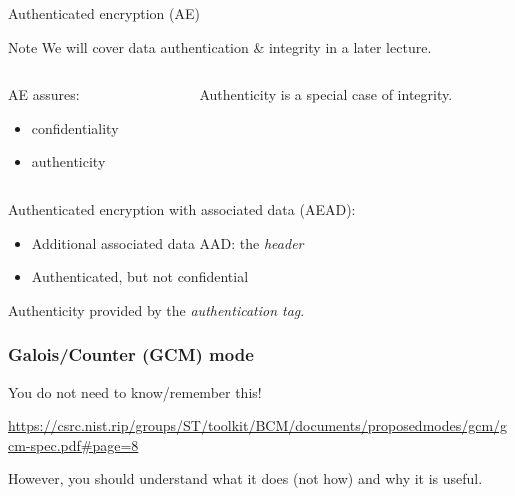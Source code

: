 \begin{frame}{Authenticated encryption (AE)}
  \begin{block}{Note}
    We will cover data authentication \& integrity in a later lecture.
  \end{block}

  \vspace*{1em}

  \begin{columns}[b]
    \begin{column}{0.4\textwidth}
      \pause
      AE assures:
      \begin{itemize}[<+->]
        \item confidentiality
        \item authenticity
      \end{itemize}
    \end{column}
    \begin{column}{0.53\textwidth}
      \pause
      Authenticity is a special case of integrity.
    \end{column}
  \end{columns}

  \vspace*{1em}

  \pause
  Authenticated encryption with associated data (AEAD):
  \begin{itemize}[<+->]
    \item Additional associated data AAD: the \emph{header}
    \item Authenticated, but not confidential
  \end{itemize}

  \vspace*{1em}

  \pause
  Authenticity provided by the \emph{authentication tag}.
\end{frame}

\begin{frame}
  \frametitle{Galois/Counter (GCM) mode}

  You do not need to know/remember this!
  \begin{center}
    \url{https://csrc.nist.rip/groups/ST/toolkit/BCM/documents/proposedmodes/gcm/gcm-spec.pdf\#page=8}
  \end{center}
  \pause
  However, you should understand what it does (not how) and why it is useful.
\end{frame}


